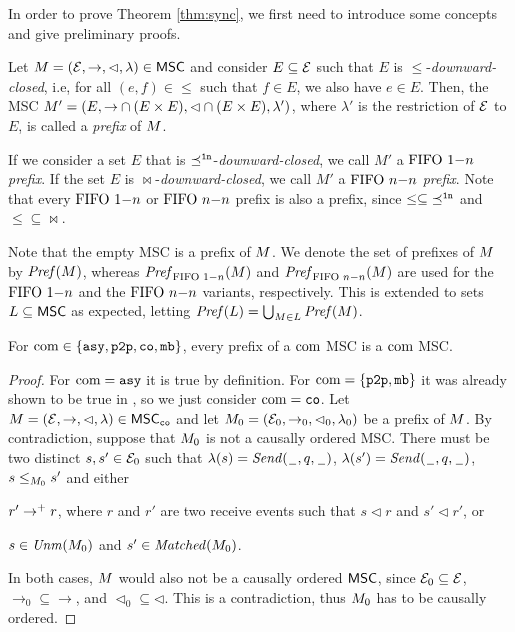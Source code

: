 In order to prove Theorem \ref{thm:sync}, we first need to introduce some concepts and give preliminary proofs. 

\begin{definition}[Prefix]
	Let $M = (\mathcal{E},\to,\lhd,\lambda) \in \mathsf{MSC}$ and consider
	$E \subseteq \mathcal{E}$ such that $E$ is ${\le}$-\emph{downward-closed}, i.e,
	for all $(e,f) \in {\le}$ such that $f \in E$, we also have $e \in E$.
	Then, the MSC $M' = (E,{\to} \cap (E \times E),{\lhd} \cap (E \times E),\lambda')$,
	where $\lambda'$ is the restriction of $\mathcal{E}$ to $E$, is called a \emph{prefix}
	of $M$. 	
\end{definition}

If we consider a set $E$ that is ${\preceq^{\mathtt{1n}}}$-\emph{downward-closed}, we call $M'$ a \emph{$\text{FIFO } 1\mathsf{-}n$ prefix}.
If the set $E$ is ${\bowtie}$-\emph{downward-closed}, we call $M'$ a \emph{$\text{FIFO } n\mathsf{-}n$ prefix}. Note that every $\text{FIFO } 1\mathsf{-}n$ or $\text{FIFO } n\mathsf{-}n$ prefix is also a prefix, since $\le \subseteq {\preceq^{\ensuremath{\mathtt{1n}}}}$ and $\le \subseteq {\bowtie}$.

Note that the empty MSC is a prefix of $M$.
We denote the set of prefixes of $M$ by $\mathit{Pref}(M)$, whereas $\mathit{Pref}_{\text{FIFO } 1\mathsf{-}n}(M)$ and $\mathit{Pref}_{\text{FIFO } n\mathsf{-}n}(M)$ are used for the $\text{FIFO } 1\mathsf{-}n$ and the $\text{FIFO } n\mathsf{-}n$ variants, respectively.
This is extended to sets $L \subseteq \mathsf{MSC}$ as expected, letting
$\mathit{Pref}(L) = \bigcup_{M \in L} \mathit{Pref}(M)$.

\begin{proposition}
	\label{prop:prefixes}
	For $\textup{com} \in \{\mathtt{asy}, \mathtt{p2p}, \mathtt{co}, \mathtt{mb}\}$, every prefix of a $\textup{com}$ MSC is a $\textup{com}$ MSC.
\end{proposition}
\begin{proof}
    For $\textup{com} = \mathtt{asy}$ it is true by definition. For $\textup{com} = \{\mathtt{p2p}, \mathtt{mb}\}$ it was already shown to be true in \cite{DBLP:conf/concur/BolligGFLLS21}, so we just consider $\textup{com} = \mathtt{co}$. Let $M = (\mathcal{E}, \to, \lhd, \lambda) \in \mathsf{MSC}_{\mathtt{co}}$ and let $M_0 =
    (\mathcal{E}_0, \to_0, \lhd_0, \lambda_0)$ be a prefix of $M$. By contradiction, suppose that $M_0$ is not a	causally ordered MSC. There must be two distinct $s,s' \in \mathcal{E}_0$ such that $\lambda(s)={\mathit{Send}(\hspace{0.1em}\underline{\hspace{0.5em}}\hspace{0.1em},q,\hspace{0.1em}\underline{\hspace{0.5em}}\hspace{0.1em})}$, $\lambda(s')={\mathit{Send}(\hspace{0.1em}\underline{\hspace{0.5em}}\hspace{0.1em},q,\hspace{0.1em}\underline{\hspace{0.5em}}\hspace{0.1em})}$, $s \le_{M_0} s'$ and either
    \begin{enumerate*}[label={(\roman*)}]
        \item $r' \to^+ r$, where $r$ and $r'$ are two receive events such that $s \lhd r$ and $s' \lhd r'$, or
        \item $s \in \mathit{Unm}(M_0)$ and $s' \in \mathit{Matched}(M_0)$.
    \end{enumerate*}
    In both cases, $M$ would also not be a causally ordered $\mathsf{MSC}$, since $\mathcal{E}_0 \subseteq \mathcal{E}$, ${\rightarrow_0} \subseteq {\rightarrow}$, and ${\lhd_0} \subseteq {\lhd}$. This is a contradiction, thus $M_0$ has to be causally ordered.
\end{proof}

